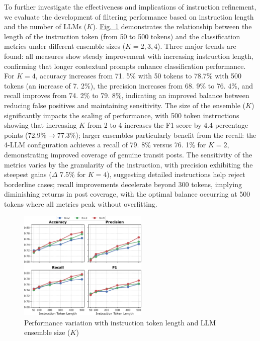 \documentclass[a4paper,fleqn,12pt]{cas-sc}
\begin{document}
To further investigate the effectiveness and implications of instruction refinement, we evaluate the development of filtering performance based on instruction length and the number of LLMs (\(K\)). \hyperref[fig:instruction_length]{Fig.~\ref{fig:instruction_length}} demonstrates the relationship between the length of the instruction token (from 50 to 500 tokens) and the classification metrics under different ensemble sizes (\(K=2,3,4\)). Three major trends are found: all measures show steady improvement with increasing instruction length, confirming that longer contextual prompts enhance classification performance. For $K=4$, accuracy increases from 71. 5\% with 50 tokens to 78.7\% with 500 tokens (an increase of 7. 2\%), the precision increases from 68. 9\% to 76. 4\%, and recall improves from 74. 2\% to 79. 8\%, indicating an improved balance between reducing false positives and maintaining sensitivity. The size of the ensemble ($K$) significantly impacts the scaling of performance, with 500 token instructions showing that increasing $K$ from 2 to 4 increases the F1 score by 4.4 percentage points (72.9\%$\rightarrow$77.3\%); larger ensembles particularly benefit from the recall: the 4-LLM configuration achieves a recall of 79. 8\% versus 76. 1\% for $K=2$, demonstrating improved coverage of genuine transit posts. The sensitivity of the metrics varies by the granularity of the instruction, with precision exhibiting the steepest gains ($\Delta$ 7.5\% for $K=4$), suggesting detailed instructions help reject borderline cases; recall improvements decelerate beyond 300 tokens, implying diminishing returns in post coverage, with the optimal balance occurring at 500 tokens where all metrics peak without overfitting.

\begin{figure}[!ht]
\centering
\includegraphics[width=0.55\textwidth]{figs/instruction_length_performance.pdf}
\caption{Performance variation with instruction token length and LLM ensemble size (\(K\))}\label{fig:instruction_length}
\end{figure}
\end{document}
